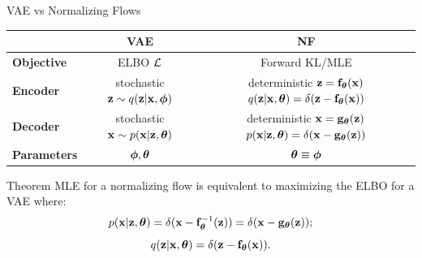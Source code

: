 \documentclass{beamer}
\begin{document}
\begin{frame}{VAE vs Normalizing Flows}
	\begin{table}[]
		\begin{tabular}{l|c|c}
			& \textbf{VAE} & \textbf{NF} \\ \hline
			\textbf{Objective} & ELBO $\mathcal{L}$ & Forward KL/MLE \\ \hline
			\textbf{Encoder} & \shortstack{stochastic \\ $\mathbf{z} \sim q (\mathbf{z} | \mathbf{x}, \boldsymbol{\phi})$} &  \shortstack{\\ deterministic \\ $\mathbf{z} = \mathbf{f}_{\boldsymbol{\theta}}(\mathbf{x})$ \\ $q(\mathbf{z} | \mathbf{x}, \boldsymbol{\theta}) = \delta(\mathbf{z} - \mathbf{f}_{\boldsymbol{\theta}}(\mathbf{x}))$}  \\ \hline
			\textbf{Decoder} & \shortstack{stochastic \\ $\mathbf{x} \sim p (\mathbf{x} | \mathbf{z}, \boldsymbol{\theta})$} & \shortstack{\\ deterministic \\ $\mathbf{x} = \mathbf{g}_{\boldsymbol{\theta}}(\mathbf{z})$ \\ $ p(\mathbf{x} | \mathbf{z}, \boldsymbol{\theta}) = \delta(\mathbf{x} - \mathbf{g}_{\boldsymbol{\theta}}(\mathbf{z}))$} \\ \hline
			\textbf{Parameters}  & $\boldsymbol{\phi}, \boldsymbol{\theta}$ & $\boldsymbol{\theta} \equiv \boldsymbol{\phi}$\\ 
		\end{tabular}
	\end{table}
	\vspace{-0.3cm}
	\eqpause
	\begin{block}{Theorem}
		MLE for a normalizing flow is equivalent to maximizing the ELBO for a VAE where:
		\vspace{-0.3cm}
		\[
			p(\mathbf{x} | \mathbf{z}, \boldsymbol{\theta}) = \delta (\mathbf{x} - \mathbf{f}^{-1}_{\boldsymbol{\theta}}(\mathbf{z})) = \delta (\mathbf{x} - \mathbf{g}_{\boldsymbol{\theta}}(\mathbf{z}));
		\]
		\[
			q(\mathbf{z} | \mathbf{x}, \boldsymbol{\theta}) = \delta (\mathbf{z} - \mathbf{f}_{\boldsymbol{\theta}}(\mathbf{x})).
		\]
	\end{block}
\end{frame}
\end{document}
